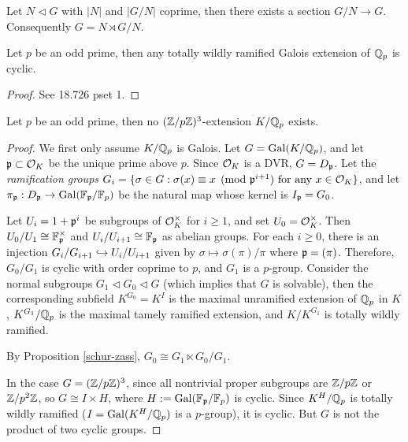 \documentclass[11pt]{amsart}
\begin{document}
\begin{prop}
\label{schur-zass}
    Let $N \lhd G$ with $|N|$ and $|G/N|$ coprime, then there exists a section $G/N\to G$. Consequently $G = N \rtimes G/N$.
\end{prop}

\begin{prop}
    Let $p$ be an odd prime, then any totally wildly ramified Galois extension of $\mathbb{Q}_p$ is cyclic.
\end{prop}

\begin{proof}
    See 18.726 pset 1.
\end{proof}

\begin{thm}
    Let $p$ be an odd prime, then no $(\mathbb{Z}/p\mathbb{Z})^3$-extension $K/\mathbb{Q}_p$ exists.
\end{thm}

\begin{proof}
    We first only assume $K/\mathbb{Q}_p$ is Galois. Let $G = \operatorname{Gal}(K/\mathbb{Q}_p)$, and let $\mathfrak{p}\subset \mathcal{O}_K$ be the unique prime above $p$. Since $\mathcal{O}_K$ is a DVR, $G = D_{\mathfrak{p}}$. Let the \emph{ramification groups} $G_i = \{\sigma\in G: \sigma(x) \equiv x \pmod{\mathfrak{p}^{i+1}} \text{ for any } x\in \mathcal{O}_K\}$, and let $\pi_{\mathfrak{p}}: D_{\mathfrak{p}}\to \operatorname{Gal}(\mathbb{F}_{\mathfrak{p}}/\mathbb{F}_p)$ be the natural map whose kernel is $I_{\mathfrak{p}} = G_0$. 
    
    Let $U_i = 1 + \mathfrak{p}^i$ be subgroups of $\mathcal{O}_K^{\times}$ for $i\ge 1$, and set $U_0 = \mathcal{O}_K^{\times}$. Then $U_0/U_1 \cong \mathbb{F}_{\mathfrak{p}}^{\times}$ and $U_i/U_{i+1} \cong \mathbb{F}_{\mathfrak{p}}$ as abelian groups. For each $i\ge 0$, there is an injection $G_i/G_{i+1} \hookrightarrow U_i/U_{i+1}$ given by $\sigma \mapsto \sigma(\pi)/\pi$ where $\mathfrak{p} = (\pi)$. Therefore, $G_0/G_1$ is cyclic with order coprime to $p$, and $G_1$ is a $p$-group. Consider the normal subgroups $G_1\lhd G_0\lhd G$ (which implies that $G$ is solvable), then the corresponding subfield $K^{G_0} = K^I$ is the maximal unramified extension of $\mathbb{Q}_p$ in $K$, $K^{G_1}/\mathbb{Q}_p$ is the maximal tamely ramified extension, and $K/K^{G_1}$ is totally wildly ramified.
    
    By Proposition \ref{schur-zass}, $G_0 \cong G_1 \ltimes G_0/G_1$. 
    
    In the case $G = (\mathbb{Z}/p\mathbb{Z})^3$, since all nontrivial proper subgroups are $\mathbb{Z}/p\mathbb{Z}$ or $\mathbb{Z}/p^2\mathbb{Z}$, so $G\cong I\times H$, where $H:=\operatorname{Gal}(\mathbb{F}_{\mathfrak{p}}/\mathbb{F}_p)$ is cyclic. Since $K^H/\mathbb{Q}_p$ is totally wildly ramified ($I = \operatorname{Gal}(K^H/\mathbb{Q}_p)$ is a $p$-group), it is cyclic. But $G$ is not the product of two cyclic groups.
\end{proof}
\end{document}
